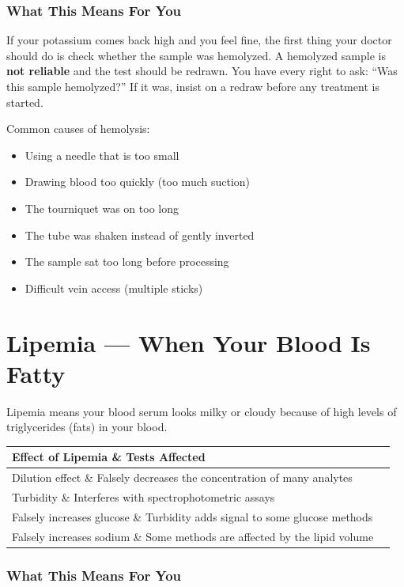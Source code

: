 \subsubsection{What This Means For You}

If your potassium comes back high and you feel fine, the first thing your doctor should do is check whether the sample was hemolyzed. A hemolyzed sample is \textbf{not reliable} and the test should be redrawn. You have every right to ask: ``Was this sample hemolyzed?'' If it was, insist on a redraw before any treatment is started.

Common causes of hemolysis:
\begin{itemize}
    \item Using a needle that is too small
    \item Drawing blood too quickly (too much suction)
    \item The tourniquet was on too long
    \item The tube was shaken instead of gently inverted
    \item The sample sat too long before processing
    \item Difficult vein access (multiple sticks)
\end{itemize}

\clearpage
\section{Lipemia --- When Your Blood Is Fatty}

Lipemia means your blood serum looks milky or cloudy because of high levels of triglycerides (fats) in your blood.

\begin{longtable}{@{}ll@{}}
\toprule
\textbf{Effect of Lipemia} \& \textbf{Tests Affected} \\
\midrule
Dilution effect \& Falsely decreases the concentration of many analytes \\
Turbidity \& Interferes with spectrophotometric assays \\
Falsely increases glucose \& Turbidity adds signal to some glucose methods \\
Falsely increases sodium \& Some methods are affected by the lipid volume \\
\bottomrule
\end{longtable}

\subsubsection{What This Means For You}

